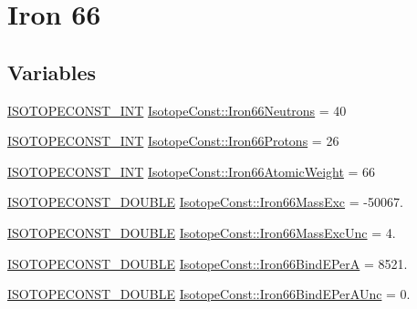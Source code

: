 \hypertarget{group___isotope_const-_iron-_fe66}{}\section{Iron 66}
\label{group___isotope_const-_iron-_fe66}
\subsection*{Variables}
\begin{DoxyCompactItemize}
\item 
\mbox{\hyperlink{group___isotope_const-_macros_ga5f18360b3e99483a35c32d789e62621c}{I\+S\+O\+T\+O\+P\+E\+C\+O\+N\+S\+T\+\_\+\+I\+NT}} \mbox{\hyperlink{group___isotope_const-_iron-_fe66_ga7edd69e5d4ff68b7d176dac8bd466933}{Isotope\+Const\+::\+Iron66\+Neutrons}} = 40
\item 
\mbox{\hyperlink{group___isotope_const-_macros_ga5f18360b3e99483a35c32d789e62621c}{I\+S\+O\+T\+O\+P\+E\+C\+O\+N\+S\+T\+\_\+\+I\+NT}} \mbox{\hyperlink{group___isotope_const-_iron-_fe66_ga7bbd48349201aa6639c5fffc94dd66ad}{Isotope\+Const\+::\+Iron66\+Protons}} = 26
\item 
\mbox{\hyperlink{group___isotope_const-_macros_ga5f18360b3e99483a35c32d789e62621c}{I\+S\+O\+T\+O\+P\+E\+C\+O\+N\+S\+T\+\_\+\+I\+NT}} \mbox{\hyperlink{group___isotope_const-_iron-_fe66_gad8ed02476c5ea4601a3d2ca9a36e6cbc}{Isotope\+Const\+::\+Iron66\+Atomic\+Weight}} = 66
\item 
\mbox{\hyperlink{group___isotope_const-_macros_ga8f45a7272ce02c0b4c65c44636ed719a}{I\+S\+O\+T\+O\+P\+E\+C\+O\+N\+S\+T\+\_\+\+D\+O\+U\+B\+LE}} \mbox{\hyperlink{group___isotope_const-_iron-_fe66_gad9490beb8b81109e324099764637661d}{Isotope\+Const\+::\+Iron66\+Mass\+Exc}} = -\/50067.
\item 
\mbox{\hyperlink{group___isotope_const-_macros_ga8f45a7272ce02c0b4c65c44636ed719a}{I\+S\+O\+T\+O\+P\+E\+C\+O\+N\+S\+T\+\_\+\+D\+O\+U\+B\+LE}} \mbox{\hyperlink{group___isotope_const-_iron-_fe66_ga74d8abcc0e1983f857c2617d2bfb9e94}{Isotope\+Const\+::\+Iron66\+Mass\+Exc\+Unc}} = 4.
\item 
\mbox{\hyperlink{group___isotope_const-_macros_ga8f45a7272ce02c0b4c65c44636ed719a}{I\+S\+O\+T\+O\+P\+E\+C\+O\+N\+S\+T\+\_\+\+D\+O\+U\+B\+LE}} \mbox{\hyperlink{group___isotope_const-_iron-_fe66_gadbb56b26eca1076ef8cf1da0a5bfac20}{Isotope\+Const\+::\+Iron66\+Bind\+E\+PerA}} = 8521.
\item 
\mbox{\hyperlink{group___isotope_const-_macros_ga8f45a7272ce02c0b4c65c44636ed719a}{I\+S\+O\+T\+O\+P\+E\+C\+O\+N\+S\+T\+\_\+\+D\+O\+U\+B\+LE}} \mbox{\hyperlink{group___isotope_const-_iron-_fe66_ga5f041f67811c81f461240eddf880569a}{Isotope\+Const\+::\+Iron66\+Bind\+E\+Per\+A\+Unc}} = 0.

\end{DoxyCompactItemize}
